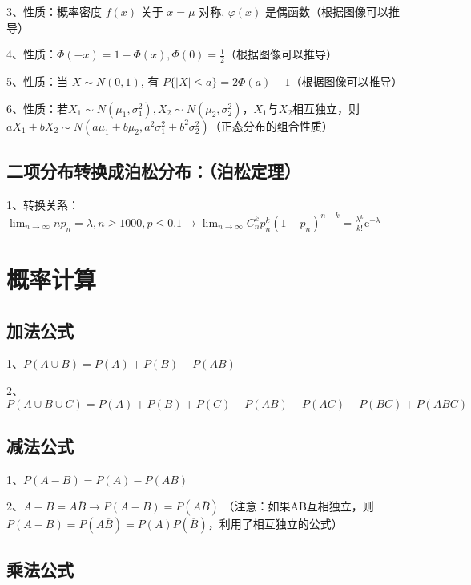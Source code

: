 3、性质：概率密度 $f(x)$ 关于 $x=\mu$ 对称, $\varphi(x)$ 是偶函数（根据图像可以推导）

4、性质：$\Phi(-x)=1-\Phi(x), \Phi(0)=\frac{1}{2}$（根据图像可以推导）

5、性质：当 $X \sim N(0,1)$, 有 $P\{|X| \leqslant a\}=2 \Phi(a)-1$（根据图像可以推导）

6、性质：若$X_{1} \sim N\left(\mu_{1}, \sigma_{1}^{2}\right), X_{2} \sim N\left(\mu_{2}, \sigma_{2}^{2}\right)$，$X_{1}$与$X_{2}$相互独立，则$a X_{1}+b X_{2} \sim N\left(a \mu_{1}+b \mu_{2}, a^{2} \sigma_{1}^{2}+b^{2} \sigma_{2}^{2}\right)$（正态分布的组合性质）



\subsection{二项分布转换成泊松分布：（泊松定理）}

1、转换关系：$\lim_{n \rightarrow \infty}np_n=\lambda, n\ge1000,p\le0.1 \rightarrow \lim _{n \rightarrow \infty} C_{n}^{k} p_{n}^{k}\left(1-p_{n}\right)^{n-k}=\frac{\lambda^{k}}{k !} \mathrm{e}^{-\lambda}$

\section{概率计算}



\subsection{加法公式}

1、$P(A\cup B) = P(A)+P(B)-P(AB)$

2、$P(A\cup B \cup C) = P(A)+P(B)+P(C)-P(AB)-P(AC)-P(BC)+P(ABC)$



\subsection{减法公式}

1、$P(A - B) = P(A)-P(AB)$

2、$A-B=A\overline B \rightarrow P(A-B) = P(A\overline B)$ （注意：如果AB互相独立，则$P(A-B) = P(A\overline B)=P(A)P(\overline B)$，利用了相互独立的公式）



\subsection{乘法公式}

